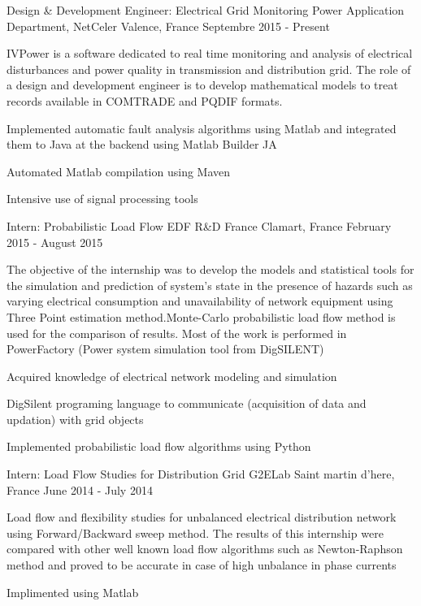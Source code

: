 
\begin{cventries}

\cventry
{Design \& Development Engineer: Electrical Grid Monitoring}
{Power Application Department, NetCeler}
{Valence, France}
{Septembre 2015 - Present}
{
\begin{cvitems}
\item {IVPower is a  software dedicated to real time monitoring and analysis of electrical disturbances and power quality in transmission and distribution grid. The role of a design and development engineer is to develop mathematical models to treat records available in COMTRADE and PQDIF formats.}
\item {Implemented automatic fault analysis algorithms using Matlab and integrated them to Java at the backend using Matlab Builder JA}
\item {Automated Matlab compilation using Maven}
\item {Intensive use of signal processing tools}
\end{cvitems}
}

\cventry
{Intern: Probabilistic Load Flow}
{EDF R\&D France}
{Clamart, France}
{February 2015 - August 2015}
{
\begin{cvitems}
\item {The objective of the internship was to develop the models and statistical tools
for the simulation and prediction of system's state in the presence of hazards such as varying electrical consumption and unavailability of network equipment using Three Point estimation method.Monte-Carlo probabilistic load flow method is used for the comparison of results. Most of the work is performed in PowerFactory (Power system simulation tool from DigSILENT)}
\item {Acquired knowledge of electrical network modeling and simulation}
\item {DigSilent programing language to communicate (acquisition of data and updation) with grid objects}
\item {Implemented probabilistic load flow algorithms using Python}
\end{cvitems}
}

\cventry
{Intern: Load Flow Studies for Distribution Grid}
{G2ELab}
{Saint martin d'here, France}
{June 2014 - July 2014}
{%
\begin{cvitems}
\item {Load flow and flexibility studies for unbalanced electrical distribution network using Forward/Backward sweep method. The results of this internship were compared with other well known load flow algorithms such as Newton-Raphson method and proved to be accurate in case of high unbalance in phase currents}
\item {Implimented using Matlab}
\end{cvitems} 
}


\end{cventries}
